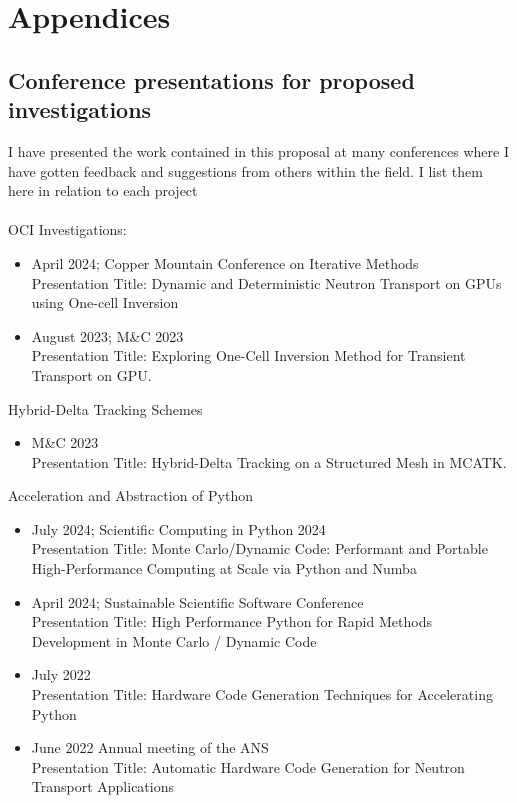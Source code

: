 \chapter{Appendices} \label{appA}

\section{Conference presentations for proposed investigations}
I have presented the work contained in this proposal at many conferences where I have gotten feedback and suggestions from others within the field. I list them here in relation to each project\\
\\
OCI Investigations:
\begin{itemize}
    \item April 2024; Copper Mountain Conference on Iterative Methods\\
    Presentation Title: Dynamic and Deterministic Neutron Transport on GPUs using One-cell Inversion
    \item August 2023; M\&C 2023\\
    Presentation Title: Exploring One-Cell Inversion Method for Transient Transport on GPU.
\end{itemize}
Hybrid-Delta Tracking Schemes
\begin{itemize}
    \item M\&C 2023\\
    Presentation Title: Hybrid-Delta Tracking on a Structured Mesh in MCATK.
\end{itemize}
Acceleration and Abstraction of Python
\begin{itemize}
    \item July 2024; Scientific Computing in Python 2024\\
    Presentation Title: Monte Carlo/Dynamic Code: Performant and Portable High-Performance Computing at Scale via Python and Numba 
    \item April 2024; Sustainable Scientific Software Conference\\
    Presentation Title: High Performance Python for Rapid Methods Development in Monte Carlo / Dynamic Code
    \item July 2022\\
    Presentation Title: Hardware Code Generation Techniques for Accelerating Python
    \item June 2022 Annual meeting of the ANS\\
    Presentation Title: Automatic Hardware Code Generation for Neutron Transport Applications
\end{itemize}

